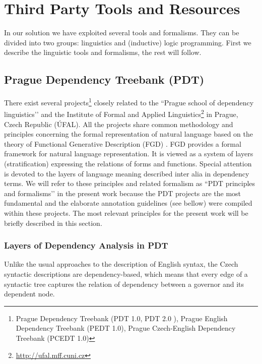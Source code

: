 \chapter{Third Party Tools and Resources} \label{sec:ch_third_party}

\graphicspath{{../img/ch30/}}


In our solution we have exploited several tools and formalisms. They can be divided into two groups: linguistics and (inductive) logic programming. First we describe the linguistic tools and formalisms, the rest will follow.



\section{Prague Dependency Treebank (PDT)} \label{sec:third_pdt}
There exist several projects\footnote{Prague Dependency Treebank
 (PDT 1.0, PDT 2.0 \citep{biblio:PDT20_CD}), Prague English Dependency Treebank (PEDT 1.0), Prague Czech-English Dependency Treebank (PCEDT 1.0)} 
closely related to the ``Prague school of dependency linguistics’’ and the Institute of Formal and Applied Linguistics\footnote{\url{http://ufal.mff.cuni.cz}} in Prague, Czech Republic (ÚFAL). All the projects share common methodology and principles concerning the formal representation of natural language %
 based on the theory of Functional Generative Description (FGD) \citep{SgallHajicovaPanevova1986}. FGD provides a formal framework for natural language representation. It is viewed as a system of layers (stratification) expressing the relations of forms and functions. Special attention is devoted to the layers of language meaning described inter alia in dependency terms.
We will refer to these principles and related formalism as ``PDT principles and formalisms’’ in the present work because the PDT projects are the most fundamental and the elaborate annotation guidelines (see bellow) were compiled within these projects. The most relevant principles for the present work will be briefly described in this section.

\subsection{Layers of Dependency Analysis in PDT} \label{sec:third_PDT_layers}

Unlike the usual approaches to the description of English syntax, the Czech syntactic descriptions are dependency-based, which means that every edge of a syntactic tree captures the relation of dependency between a governor and its dependent node. 

